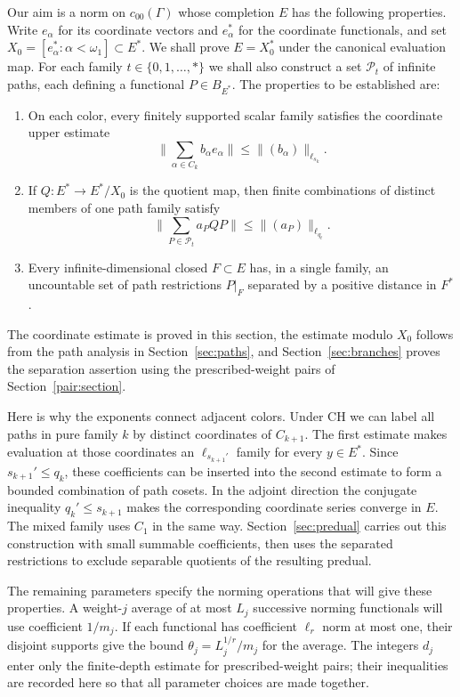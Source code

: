 Our aim is a norm on $c_{00}(\Gamma)$ whose completion $E$ has the
following properties. Write $e_\alpha$ for its coordinate vectors and
$e_\alpha^*$ for the coordinate functionals, and set
$X_0=[e_\alpha^*: \alpha<\omega_1]\subset E^*$.
We shall prove $E=X_0^*$ under the canonical evaluation map. For each
family $t\in\{0,1,\ldots,*\}$ we shall also construct a set $\mathcal P_t$ of infinite paths, each
defining a functional $P\in B_{E^*}$.
The properties to be established are:
\begin{enumerate}
\item On each color, every finitely supported scalar family satisfies the
coordinate upper estimate
\[
 \Big\|\sum_{\alpha\in C_k}b_\alpha e_\alpha\Big\|
 \le \|(b_\alpha)\|_{\ell_{s_k}}.
\]
\item If $Q:E^*\to E^*/X_0$ is the quotient map, then finite
combinations of distinct members of one path family satisfy
\[
 \Big\|\sum_{P\in\mathcal P_t}a_P QP\Big\|
 \le \|(a_P)\|_{\ell_{q_t}}.
\]
\item Every infinite-dimensional closed $F\subset E$ has, in a single
family, an uncountable set of path restrictions $P|_F$ separated by a
positive distance in $F^*$.
\end{enumerate}
The coordinate estimate is proved in this section, the estimate modulo
$X_0$ follows from the path analysis in Section~\ref{sec:paths}, and
Section~\ref{sec:branches} proves the separation assertion using the
prescribed-weight pairs of Section~\ref{pair:section}.

Here is why the exponents connect adjacent colors. Under CH we can label
all paths in pure family $k$ by distinct coordinates of $C_{k+1}$.
The first estimate makes evaluation at those coordinates an
$\ell_{s_{k+1}'}$ family for every $y\in E^*$. Since
$s_{k+1}'\le q_k$, these coefficients can be inserted into the second
estimate to form a bounded combination of path cosets. In the adjoint
direction the conjugate inequality $q_k'\le s_{k+1}$ makes the
corresponding coordinate series converge in $E$. The mixed family uses
$C_1$ in the same way. Section~\ref{sec:predual} carries out this
construction with small summable coefficients, then uses the separated
restrictions to exclude separable quotients of the resulting predual.

The remaining parameters specify the norming operations that will give
these properties. A weight-$j$ average of at most $L_j$ successive norming functionals
will use coefficient $1/m_j$. If each functional has coefficient
$\ell_r$ norm at most one, their disjoint supports give the bound
$\theta_j=L_j^{1/r}/m_j$ for the average. The integers $d_j$ enter only the finite-depth
estimate for prescribed-weight pairs; their inequalities are recorded
here so that all parameter choices are made together.

